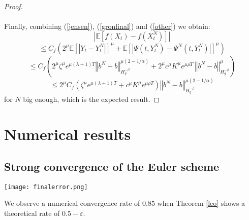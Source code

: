 \documentclass[12pt]{article}
\newcommand{\norme}[1]{\left\Vert #1\right\Vert}
\newcommand{\E}{\mathbb{E}}
\begin{document}
\begin{proof}
    \paragraph{}
    Finally, combining (\ref{jensen}), (\ref{gronfinal}) and (\ref{other}) we obtain:    
    \begin{equation*}
    \left|\E\left[f\left(X_t\right)-f\left(X_t^N\right)\right]\right| 
    \end{equation*}
    \begin{equation*}
    \leq C_f  \left(2^\mu\E\left[\left|Y_t-Y_t^N\right|\right]^\mu+\E\left[\left|\Psi\left(t,Y_t^N\right)-\Psi^N\left(t,Y_t^N\right)\right|\right]^\mu\right)
    \end{equation*} 
    \begin{equation*}
    \leq C_f  \left(2^\mu\zeta^\mu e^{\mu(\lambda+1)T} \norme{b^N-b}_{H^{-\beta}_{q}}^{\mu(2-1/\alpha)}+2^\mu c^\mu K^\mu e^{\mu\rho T}\ \norme{b^N-b}_{H^{-\beta}_q}^\mu\right)
    \end{equation*}
    \begin{equation*}
    \leq 2^\mu C_f  \left(\zeta^\mu e^{\mu(\lambda+1)T} + c^\mu K^\mu e^{\mu\rho T}\right)\norme{b^N-b}_{H^{-\beta}_{q}}^{\mu(2-1/\alpha)}
    \end{equation*}       
    for $N$ big enough, which is the expected result.
    
\end{proof}   

\section{Numerical results}
    \subsection{Strong convergence of the Euler scheme}
    
        \begin{center}
            \texttt{[image: finalerror.png]}
        \end{center}
    
    We observe a numerical convergence rate of $0.85$ when Theorem \ref{leo} shows a theoretical rate of $0.5-\varepsilon$.
 


    
\end{document}
